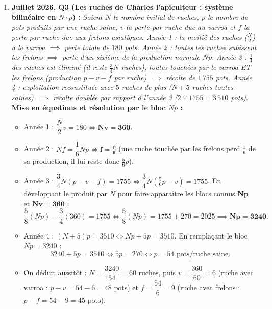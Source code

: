\begin{exemple}
\begin{enumerate}
    \item \textbf{Juillet 2026, Q3 (Les ruches de Charles l'apiculteur : système bilinéaire en $N \cdot p$) :}
    \emph{Soient $N$ le nombre initial de ruches, $p$ le nombre de pots produits par une ruche saine, $v$ la perte par ruche due au varroa et $f$ la perte par ruche due aux frelons asiatiques.
    Année 1 : la moitié des ruches ($\frac{N}{2}$) a le varroa $\implies$ perte totale de $180$ pots.
    Année 2 : toutes les ruches subissent les frelons $\implies$ perte d'un sixième de la production normale $Np$.
    Année 3 : $\frac{1}{4}$ des ruches est éliminé (il reste $\frac{3}{4}N$ ruches), toutes touchées par le varroa ET les frelons (production $p - v - f$ par ruche) $\implies$ récolte de $1\,755$ pots.
    Année 4 : exploitation reconstituée avec $5$ ruches de plus ($N + 5$ ruches toutes saines) $\implies$ récolte doublée par rapport à l'année 3 ($2 \times 1755 = 3\,510$ pots).}\\
    \textbf{Mise en équations et résolution par le bloc $Np$ :}
    \begin{itemize}
        \item Année 1 : $\dfrac{N}{2} v = 180 \iff \mathbf{Nv = 360}$.
        \item Année 2 : $Nf = \dfrac{1}{6}Np \iff \mathbf{f = \frac{p}{6}}$ (une ruche touchée par les frelons perd $\frac{1}{6}$ de sa production, il lui reste donc $\frac{5}{6}p$).
        \item Année 3 : $\dfrac{3}{4}N(p - v - f) = 1755 \iff \dfrac{3}{4}N\left(\frac{5}{6}p - v\right) = 1755$. En développant le produit par $N$ pour faire apparaître les blocs connus $\mathbf{Np}$ et $\mathbf{Nv = 360}$ :
        \[
            \frac{5}{8}(Np) - \frac{3}{4}(360) = 1755 \iff \frac{5}{8}(Np) = 1755 + 270 = 2025 \implies \mathbf{Np = 3240}.
        \]
        \item Année 4 : $(N + 5)p = 3510 \iff Np + 5p = 3510$. En remplaçant le bloc $Np = 3240$ :
        \[
            3240 + 5p = 3510 \iff 5p = 270 \iff \boxed{p = 54\text{ pots/ruche saine}}.
        \]
        \item On déduit aussitôt : $N = \dfrac{3240}{54} = \boxed{60\text{ ruches}}$, puis $v = \dfrac{360}{60} = 6$ (ruche avec varroa : $p - v = 54 - 6 = \boxed{48\text{ pots}}$) et $f = \dfrac{54}{6} = 9$ (ruche avec frelons : $p - f = 54 - 9 = \boxed{45\text{ pots}}$).
    \end{itemize}
\end{enumerate}
\end{exemple}

